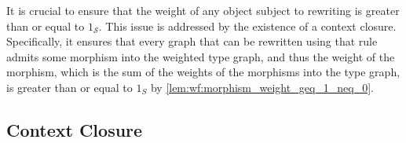 It is crucial to ensure that the weight of any object subject to rewriting is greater than or equal to $1_\mathcal{S}$.
This issue is addressed by the existence of a context closure. Specifically, it ensures that every graph that can be rewritten using that rule admits some morphism into the weighted type graph, and thus the weight of the morphism, which is the sum of the weights of the morphisms into the type graph, is greater than or equal to \(1_S\) by \autoref{lem:wf:morphism_weight_geq_1_neq_0}.

\subsection{Context Closure}
\label{sec:context_closure}

